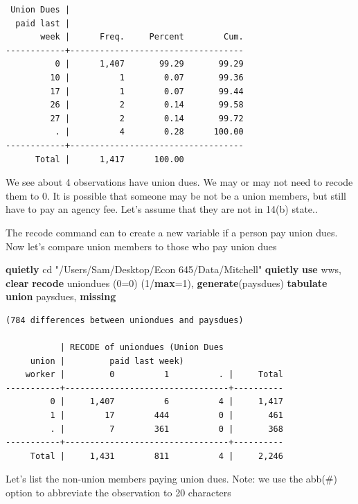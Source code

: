 \documentclass[
]{book}
\newenvironment{Shaded}{\begin{snugshade}}{\end{snugshade}}
\newcommand{\FunctionTok}[1]{\textcolor[rgb]{0.13,0.29,0.53}{\textbf{#1}}}
\newcommand{\KeywordTok}[1]{\textcolor[rgb]{0.13,0.29,0.53}{\textbf{#1}}}
\newcommand{\NormalTok}[1]{#1}
\newcommand{\StringTok}[1]{\textcolor[rgb]{0.31,0.60,0.02}{#1}}
\begin{document}
\begin{verbatim}
 Union Dues |
  paid last |
       week |      Freq.     Percent        Cum.
------------+-----------------------------------
          0 |      1,407       99.29       99.29
         10 |          1        0.07       99.36
         17 |          1        0.07       99.44
         26 |          2        0.14       99.58
         27 |          2        0.14       99.72
          . |          4        0.28      100.00
------------+-----------------------------------
      Total |      1,417      100.00
\end{verbatim}

We see about 4 observations have union dues. We may or may not need to recode them to 0. It is possible that someone may be not be a union members, but still have to pay an agency fee. Let's assume that they are not in 14(b) state..

The recode command can to create a new variable if a person pay union dues. Now let's compare union members to those who pay union dues

\begin{Shaded}
\begin{Highlighting}[]
\KeywordTok{quietly}\NormalTok{ cd }\StringTok{"/Users/Sam/Desktop/Econ 645/Data/Mitchell"}
\KeywordTok{quietly} \KeywordTok{use}\NormalTok{ wws, }\KeywordTok{clear}
\KeywordTok{recode}\NormalTok{ uniondues (0=0) (1/}\FunctionTok{max}\NormalTok{=1), }\KeywordTok{generate}\NormalTok{(paysdues)}
\KeywordTok{tabulate} \KeywordTok{union}\NormalTok{ paysdues, }\FunctionTok{missing}
\end{Highlighting}
\end{Shaded}

\begin{verbatim}
(784 differences between uniondues and paysdues)

           | RECODE of uniondues (Union Dues
     union |         paid last week)
    worker |         0          1          . |     Total
-----------+---------------------------------+----------
         0 |     1,407          6          4 |     1,417 
         1 |        17        444          0 |       461 
         . |         7        361          0 |       368 
-----------+---------------------------------+----------
     Total |     1,431        811          4 |     2,246 
\end{verbatim}

Let's list the non-union members paying union dues.
Note: we use the abb(\#) option to abbreviate the observation to 20 characters
\end{document}
